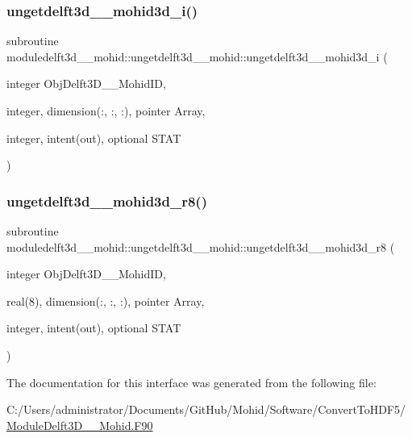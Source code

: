 \subsubsection{\texorpdfstring{ungetdelft3d\+\_\+\_\+mohid3d\+\_\+i()}{ungetdelft3d\_2\_mohid3d\_i()}}
{\footnotesize\ttfamily subroutine moduledelft3d\+\_\+\_\+mohid\+::ungetdelft3d\+\_\+\_\+mohid\+::ungetdelft3d\+\_\+\_\+mohid3d\+\_\+i (\begin{DoxyParamCaption}\item[{integer}]{Obj\+Delft3\+D\+\_\+\_\+\+Mohid\+ID,  }\item[{integer, dimension(\+:, \+:, \+:), pointer}]{Array,  }\item[{integer, intent(out), optional}]{S\+T\+AT }\end{DoxyParamCaption})\hspace{0.3cm}{\ttfamily [private]}}

\mbox{\label{interfacemoduledelft3d__2__mohid_1_1ungetdelft3d__2__mohid_a1dfaf73c03f52a89dab9004b29c9aa35}} 
\subsubsection{\texorpdfstring{ungetdelft3d\+\_\+\_\+mohid3d\+\_\+r8()}{ungetdelft3d\_2\_mohid3d\_r8()}}
{\footnotesize\ttfamily subroutine moduledelft3d\+\_\+\_\+mohid\+::ungetdelft3d\+\_\+\_\+mohid\+::ungetdelft3d\+\_\+\_\+mohid3d\+\_\+r8 (\begin{DoxyParamCaption}\item[{integer}]{Obj\+Delft3\+D\+\_\+\_\+\+Mohid\+ID,  }\item[{real(8), dimension(\+:, \+:, \+:), pointer}]{Array,  }\item[{integer, intent(out), optional}]{S\+T\+AT }\end{DoxyParamCaption})\hspace{0.3cm}{\ttfamily [private]}}



The documentation for this interface was generated from the following file\+:\begin{DoxyCompactItemize}
\item 
C\+:/\+Users/administrator/\+Documents/\+Git\+Hub/\+Mohid/\+Software/\+Convert\+To\+H\+D\+F5/\mbox{\hyperlink{_module_delft3_d__2___mohid_8_f90}{Module\+Delft3\+D\+\_\+\_\+\+Mohid.\+F90}}\end{DoxyCompactItemize}
